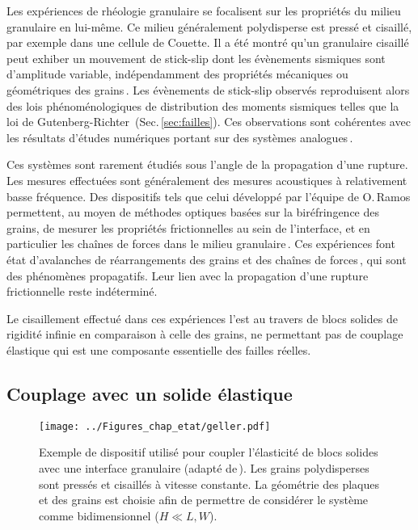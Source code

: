 Les expériences de rhéologie granulaire se focalisent sur les propriétés du milieu granulaire en lui-même. Ce milieu généralement polydisperse est pressé et cisaillé, par exemple dans une cellule de Couette. Il a été montré qu'un granulaire cisaillé peut exhiber un mouvement de stick-slip dont les évènements sismiques sont d'amplitude variable, indépendamment des propriétés mécaniques ou géométriques des grains\,\cite{anthony_influence_2005}. Les évènements de stick-slip observés reproduisent alors des lois phénoménologiques de distribution des moments sismiques telles que la loi de Gutenberg-Richter\,\cite{lherminier_continuously_2019,houdoux_micro-slips_2021,abed_zadeh_seismicity_2019} (Sec.\,\ref{sec:failles}). Ces observations sont cohérentes avec les résultats d'études numériques portant sur des systèmes analogues\,\cite{lieou_simulating_2017,laurenti_deep_2022}.


Ces systèmes sont rarement étudiés sous l'angle de la propagation d'une rupture. Les mesures effectuées sont généralement des mesures acoustiques à relativement basse fréquence. Des dispositifs tels que celui développé par l'équipe de O.\,Ramos permettent, au moyen de méthodes optiques basées sur la biréfringence des grains, de mesurer les propriétés frictionnelles au sein de l'interface, et en particulier les chaînes de forces dans le milieu granulaire\,\cite{lherminier_continuously_2019, daniels_photoelastic_2017,majmudar_contact_2005}. Ces expériences font état d'avalanches de réarrangements des grains et des chaînes de forces\,\cite{ramos_avalanche_2009,dahmen_simple_2011,bares_local_2017}, qui sont des phénomènes propagatifs. Leur lien avec la propagation d'une rupture frictionnelle reste indéterminé.

Le cisaillement effectué dans ces expériences l'est au travers de blocs solides de rigidité infinie en comparaison à celle des grains, ne permettant pas de couplage élastique qui est une composante essentielle des failles réelles.

\subsection{Couplage avec un solide élastique}

\begin{figure}[htb]
\centering
\texttt{[image: ../Figures\_chap\_etat/geller.pdf]}
\caption[Dispositif expérimental d'étude d'une interface granulaire]{Exemple de dispositif utilisé pour coupler l'élasticité de blocs solides avec une interface granulaire (adapté de\,\cite{geller_stick-slip_2015}). Les grains polydisperses sont pressés et cisaillés à vitesse constante. La géométrie des plaques et des grains est choisie afin de permettre de considérer le système comme bidimensionnel ($H\ll L,W$).}
\label{fig:geller}
\end{figure}


